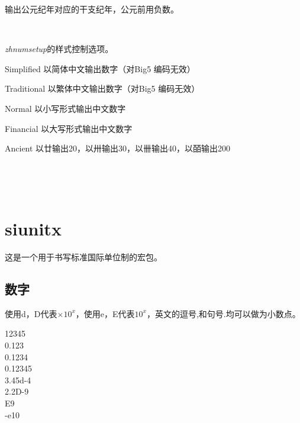 输出公元纪年对应的干支纪年，公元前用负数。

\begin{codeshow}
 \\
\zhganzhinian{\year}
\end{codeshow}

\emph{zhnumsetup}的样式控制选项。

\begin{asparadesc}
    \item [Simplified] 以简体中文输出数字（对Big5 编码无效）
    \item [Traditional] 以繁体中文输出数字（对Big5 编码无效）
    \item [Normal] 以小写形式输出中文数字
    \item [Financial] 以大写形式输出中文数字
    \item [Ancient] 以廿输出20，以卅输出30，以卌输出40，以皕输出200
\end{asparadesc}

\begin{codeshow}
\\
\end{codeshow}

\begin{codeshow}
\\
\end{codeshow}


\section{siunitx}
这是一个用于书写标准国际单位制的宏包。

\subsection{数字}


使用d，D代表$\times10^{x}$，使用e，E代表$10^{x}$，英文的逗号,和句号.均可以做为小数点。

\begin{codeshow}
\num{12345} \\
\num{0.123} \\
\num{0,1234} \\
\num{.12345} \\
\num{3.45d-4} \\
\num{2.2D-9} \\
\num{E9} \\
\num{-e10}
\end{codeshow}

